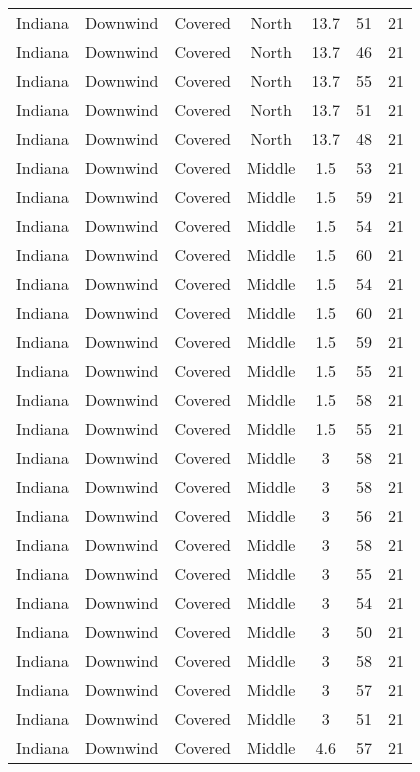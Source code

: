 \documentclass{article}
\begin{document}
\begin{longtable}[H]{ccccccc}
Indiana & Downwind & Covered     & North  & 13.7 & 51 & 21 \\
Indiana & Downwind & Covered     & North  & 13.7 & 46 & 21 \\
Indiana & Downwind & Covered     & North  & 13.7 & 55 & 21 \\
Indiana & Downwind & Covered     & North  & 13.7 & 51 & 21 \\
Indiana & Downwind & Covered     & North  & 13.7 & 48 & 21 \\
Indiana & Downwind & Covered     & Middle & 1.5  & 53 & 21 \\
Indiana & Downwind & Covered     & Middle & 1.5  & 59 & 21 \\
Indiana & Downwind & Covered     & Middle & 1.5  & 54 & 21 \\
Indiana & Downwind & Covered     & Middle & 1.5  & 60 & 21 \\
Indiana & Downwind & Covered     & Middle & 1.5  & 54 & 21 \\
Indiana & Downwind & Covered     & Middle & 1.5  & 60 & 21 \\
Indiana & Downwind & Covered     & Middle & 1.5  & 59 & 21 \\
Indiana & Downwind & Covered     & Middle & 1.5  & 55 & 21 \\
Indiana & Downwind & Covered     & Middle & 1.5  & 58 & 21 \\
Indiana & Downwind & Covered     & Middle & 1.5  & 55 & 21 \\
Indiana & Downwind & Covered     & Middle & 3    & 58 & 21 \\
Indiana & Downwind & Covered     & Middle & 3    & 58 & 21 \\
Indiana & Downwind & Covered     & Middle & 3    & 56 & 21 \\
Indiana & Downwind & Covered     & Middle & 3    & 58 & 21 \\
Indiana & Downwind & Covered     & Middle & 3    & 55 & 21 \\
Indiana & Downwind & Covered     & Middle & 3    & 54 & 21 \\
Indiana & Downwind & Covered     & Middle & 3    & 50 & 21 \\
Indiana & Downwind & Covered     & Middle & 3    & 58 & 21 \\
Indiana & Downwind & Covered     & Middle & 3    & 57 & 21 \\
Indiana & Downwind & Covered     & Middle & 3    & 51 & 21 \\
Indiana & Downwind & Covered     & Middle & 4.6  & 57 & 21 \\

\end{longtable}
\end{document}
